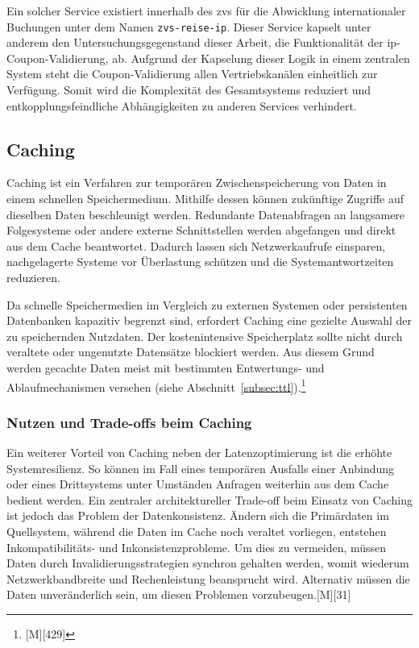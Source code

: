 Ein solcher Service existiert innerhalb des \ac{zvs} für die Abwicklung internationaler Buchungen unter dem Namen \texttt{zvs-reise-ip}. Dieser Service kapselt unter anderem den Untersuchungsgegenstand dieser Arbeit, die Funktionalität der \ac{ip}-Coupon-Validierung, ab. Aufgrund der Kapselung dieser Logik in einem zentralen System steht die Coupon-Validierung allen Vertriebskanälen einheitlich zur Verfügung. Somit wird die Komplexität des Gesamtsystems reduziert und entkopplungsfeindliche Abhängigkeiten zu anderen Services verhindert.


\subsection{Caching}
\label{subsec:caching}

Caching ist ein Verfahren zur temporären Zwischenspeicherung von Daten in einem schnellen Speichermedium. Mithilfe dessen können zukünftige Zugriffe auf dieselben Daten beschleunigt werden. Redundante Datenabfragen an langsamere Folgesysteme oder andere externe Schnittstellen werden abgefangen und direkt aus dem Cache beantwortet. Dadurch lassen sich Netzwerkaufrufe einsparen, nachgelagerte Systeme vor Überlastung schützen und die Systemantwortzeiten reduzieren.

Da schnelle Speichermedien im Vergleich zu externen Systemen oder persistenten Datenbanken kapazitiv begrenzt sind, erfordert Caching eine gezielte Auswahl der zu speichernden Nutzdaten. Der kostenintensive Speicherplatz sollte nicht durch veraltete oder ungenutzte Datensätze blockiert werden. Aus diesem Grund werden gecachte Daten meist mit bestimmten Entwertungs- und Ablaufmechanismen versehen (siehe Abschnitt~\ref{subsec:ttl}).\footnote{ [M][429]}

\subsubsection{Nutzen und Trade-offs beim Caching}

Ein weiterer Vorteil von Caching neben der Latenzoptimierung ist die erhöhte Systemresilienz. So können im Fall eines temporären Ausfalls einer Anbindung oder eines Drittsystems unter Umständen Anfragen weiterhin aus dem Cache bedient werden. Ein zentraler architektureller Trade-off beim Einsatz von Caching ist jedoch das Problem der Datenkonsistenz. Ändern sich die Primärdaten im Quellsystem, während die Daten im Cache noch veraltet vorliegen, entstehen Inkompatibilitäts- und Inkonsistenzprobleme. Um dies zu vermeiden, müssen Daten durch Invalidierungsstrategien synchron gehalten werden, womit wiederum Netzwerkbandbreite und Rechenleistung beansprucht wird. Alternativ müssen die Daten unveränderlich sein, um diesen Problemen vorzubeugen.[M][31]

